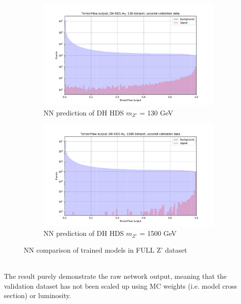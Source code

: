 \documentclass[14pt, a4paper]{book}
\begin{document}
\begin{figure}[!ht]
	\centering
	\begin{subfigure}[b]{0.49\textwidth}
        \centering
        \includegraphics[width=1\textwidth]{DH_HDS_mZp_130/VAL_unscaled.pdf}
        \caption{NN prediction of DH HDS $m_{Z'}$ = 130 GeV}\label{fig:PurelyBalanced_DH_HDS_130}
     \end{subfigure}
     \hfill
     \begin{subfigure}[b]{0.49\textwidth}
        \centering
        \includegraphics[width=1\textwidth]{DH_HDS_mZp_1500/VAL_unscaled.pdf}
        \caption{NN prediction of DH HDS $m_{Z'}$ = 1500 GeV}\label{fig:PurelyBalanced_DH_HDS_1500}
     \end{subfigure}
     \caption{NN comparison of trained models in FULL Z' dataset}\label{fig:PurelyBalanced_DH_HDS}
\end{figure}
\\The result purely demonstrate the raw network output, meaning that the validation dataset has not been scaled up using MC weights (i.e. model cross section) or luminosity.\\
\end{document}
